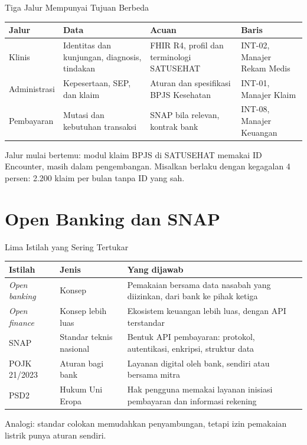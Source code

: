 \documentclass[aspectratio=169, table, 12pt]{beamer}
\begin{document}
\begin{frame}{{\Large Tiga Jalur Mempunyai Tujuan Berbeda}}
  \footnotesize
  \begin{tabularx}{\textwidth}{>{\raggedright\arraybackslash}p{1.9cm}
      >{\raggedright\arraybackslash}X >{\raggedright\arraybackslash}X >{\raggedright\arraybackslash}p{2.7cm}}
    \hline
    \textbf{Jalur} & \textbf{Data} & \textbf{Acuan} & \textbf{Baris} \\ \hline
    Klinis & Identitas dan kunjungan, diagnosis, tindakan & FHIR R4, profil dan terminologi SATUSEHAT & INT-02, Manajer Rekam Medis \\ \hline
    Administrasi & Kepesertaan, SEP, dan klaim & Aturan dan spesifikasi BPJS Kesehatan & INT-01, Manajer Klaim \\ \hline
    Pembayaran & Mutasi dan kebutuhan transaksi & SNAP bila relevan, kontrak bank & INT-08, Manajer Keuangan \\ \hline
  \end{tabularx}

  \vspace{8pt}
  \small Jalur mulai bertemu: modul klaim BPJS di SATUSEHAT memakai ID Encounter, masih dalam pengembangan. Misalkan berlaku dengan kegagalan 4 persen: 2.200 klaim per bulan tanpa ID yang sah.
\end{frame}

\section{Open Banking dan SNAP}

\begin{frame}{{\Large Lima Istilah yang Sering Tertukar}}
  \footnotesize
  \begin{tabularx}{\textwidth}{>{\raggedright\arraybackslash}p{2.3cm}
      >{\raggedright\arraybackslash}p{2.6cm} >{\raggedright\arraybackslash}X}
    \hline
    \textbf{Istilah} & \textbf{Jenis} & \textbf{Yang dijawab} \\ \hline
    \textit{Open banking} & Konsep & Pemakaian bersama data nasabah yang diizinkan, dari bank ke pihak ketiga \\ \hline
    \textit{Open finance} & Konsep lebih luas & Ekosistem keuangan lebih luas, dengan API terstandar \\ \hline
    SNAP & Standar teknis nasional & Bentuk API pembayaran: protokol, autentikasi, enkripsi, struktur data \\ \hline
    POJK 21/2023 & Aturan bagi bank & Layanan digital oleh bank, sendiri atau bersama mitra \\ \hline
    PSD2 & Hukum Uni Eropa & Hak pengguna memakai layanan inisiasi pembayaran dan informasi rekening \\ \hline
  \end{tabularx}

  \vspace{6pt}
  {\small Analogi: standar colokan memudahkan penyambungan, tetapi izin pemakaian listrik punya aturan sendiri.}
\end{frame}
\end{document}
